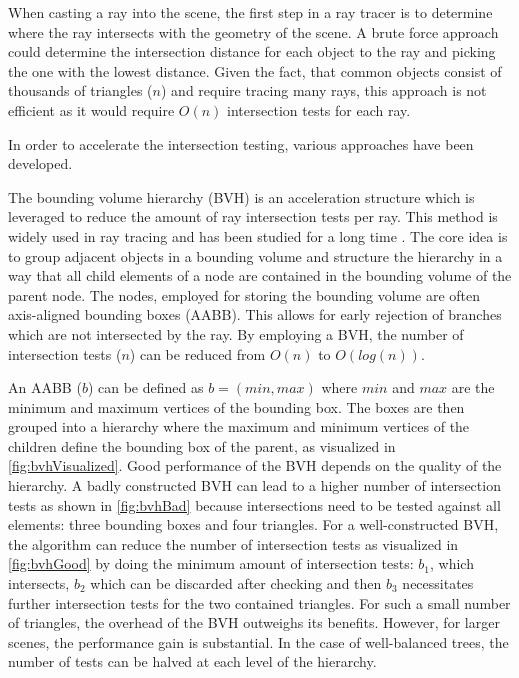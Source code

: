 When casting a ray into the scene, the first step in a ray tracer is to determine where the ray intersects with the geometry of the scene. A brute force approach could determine the intersection distance for each object to the ray and picking the one with the lowest distance. Given the fact, that common objects consist of thousands of triangles ($n$) and require tracing many rays, this approach is not efficient as it would require $O(n)$ intersection tests for each ray.

In order to accelerate the intersection testing, various approaches have been developed.

The bounding volume hierarchy (\gls{BVH}) is an acceleration structure which is leveraged to reduce the amount of ray intersection tests per ray. This method is widely used in ray tracing and has been studied for a long time \cite{rubinWhittedBvh}. The core idea is to group adjacent objects in a bounding volume and structure the hierarchy in a way that all child elements of a node are contained in the bounding volume of the parent node. The nodes, employed for storing the bounding volume are often axis-aligned bounding boxes (\gls{AABB}). This allows for early rejection of branches which are not intersected by the ray. By employing a \gls{BVH}, the number of intersection tests ($n$) can be reduced from $O(n)$ to $O(log(n))$.

An \gls{AABB} ($b$) can be defined as $b = (min, max)$ where $min$ and $max$ are the minimum and maximum vertices of the bounding box. The boxes are then grouped into a hierarchy where the maximum and minimum vertices of the children define the bounding box of the parent, as visualized in \autoref{fig:bvhVisualized}. Good performance of the \gls{BVH} depends on the quality of the hierarchy. A badly constructed \gls{BVH} can lead to a higher number of intersection tests as shown in \autoref{fig:bvhBad} because intersections need to be tested against all elements: three bounding boxes and four triangles. For a well-constructed \gls{BVH}, the algorithm can reduce the number of intersection tests as visualized in \autoref{fig:bvhGood} by doing the minimum amount of intersection tests: $b_1$, which intersects, $b_2$ which can be discarded after checking and then $b_3$ necessitates further intersection tests for the two contained triangles. For such a small number of triangles, the overhead of the \gls{BVH} outweighs its benefits. However, for larger scenes, the performance gain is substantial. In the case of well-balanced trees, the number of tests can be halved at each level of the hierarchy.

